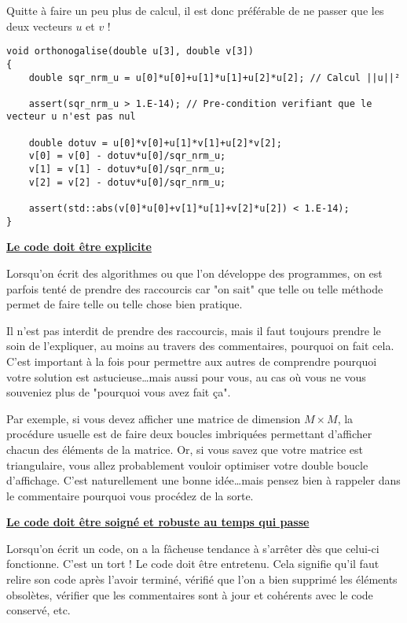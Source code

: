 Quitte à faire un peu plus de calcul, il est donc préférable de ne passer que les deux vecteurs $u$ et $v$ !
\begin{lstlisting}[caption=Exemple sans paramètre superflu]
void orthonogalise(double u[3], double v[3])
{
    double sqr_nrm_u = u[0]*u[0]+u[1]*u[1]+u[2]*u[2]; // Calcul ||u||²

    assert(sqr_nrm_u > 1.E-14); // Pre-condition verifiant que le vecteur u n'est pas nul

    double dotuv = u[0]*v[0]+u[1]*v[1]+u[2]*v[2];
    v[0] = v[0] - dotuv*u[0]/sqr_nrm_u;
    v[1] = v[1] - dotuv*u[0]/sqr_nrm_u;
    v[2] = v[2] - dotuv*u[0]/sqr_nrm_u;

    assert(std::abs(v[0]*u[0]+v[1]*u[1]+v[2]*u[2]) < 1.E-14);
}
\end{lstlisting}



\underline{\textbf{Le code doit être explicite}}

Lorsqu'on écrit des algorithmes ou que l'on développe des programmes, on est parfois tenté de prendre
des raccourcis car "on sait" que telle ou telle méthode permet de faire telle ou telle chose bien pratique.

Il n'est pas interdit de prendre des raccourcis, mais il faut toujours prendre le soin de l'expliquer, au moins
au travers des commentaires, pourquoi on fait cela. C'est important à la fois pour permettre aux autres
de comprendre pourquoi votre solution est astucieuse\ldots mais aussi pour vous, au cas où vous ne vous
souveniez plus de "pourquoi vous avez fait ça".

Par exemple, si vous devez afficher une matrice de dimension $M\times M$, la procédure usuelle est de faire deux
boucles imbriquées permettant d'afficher chacun des éléments de la matrice. Or, si vous savez que votre matrice
est triangulaire, vous allez probablement vouloir optimiser votre double boucle d'affichage. C'est naturellement
une bonne idée\ldots mais pensez bien à rappeler dans le commentaire pourquoi vous procédez de la sorte.

\underline{\textbf{Le code doit être soigné et robuste au temps qui passe}}

Lorsqu'on écrit un code, on a la fâcheuse tendance à s'arrêter dès que celui-ci fonctionne. C'est un tort !
Le code doit être entretenu. Cela signifie qu'il faut relire son code après l'avoir terminé, vérifié que l'on a bien
supprimé les éléments obsolètes, vérifier que les commentaires sont à jour et cohérents avec le code conservé, etc.

